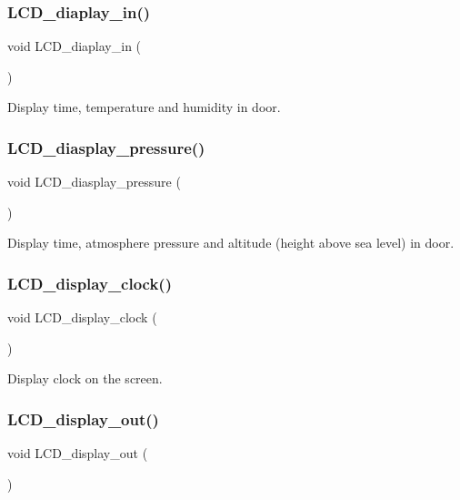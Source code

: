 \subsubsection{L\+C\+D\+\_\+diaplay\+\_\+in()}
{\footnotesize\ttfamily void L\+C\+D\+\_\+diaplay\+\_\+in (\begin{DoxyParamCaption}{ }\end{DoxyParamCaption})}



Display time, temperature and humidity in door. 

\mbox{\label{main_8c_a934668115c4afaab0461fb138c01c952}} 
\subsubsection{L\+C\+D\+\_\+diasplay\+\_\+pressure()}
{\footnotesize\ttfamily void L\+C\+D\+\_\+diasplay\+\_\+pressure (\begin{DoxyParamCaption}{ }\end{DoxyParamCaption})}



Display time, atmosphere pressure and altitude (height above sea level) in door. 

\mbox{\label{main_8c_a9b09ed8735fa154235d8db7cc5c4af46}} 
\subsubsection{L\+C\+D\+\_\+display\+\_\+clock()}
{\footnotesize\ttfamily void L\+C\+D\+\_\+display\+\_\+clock (\begin{DoxyParamCaption}{ }\end{DoxyParamCaption})}



Display clock on the screen. 

\mbox{\label{main_8c_a643de379960a0215cc077699e24e7638}} 
\subsubsection{L\+C\+D\+\_\+display\+\_\+out()}
{\footnotesize\ttfamily void L\+C\+D\+\_\+display\+\_\+out (\begin{DoxyParamCaption}{ }\end{DoxyParamCaption})}



